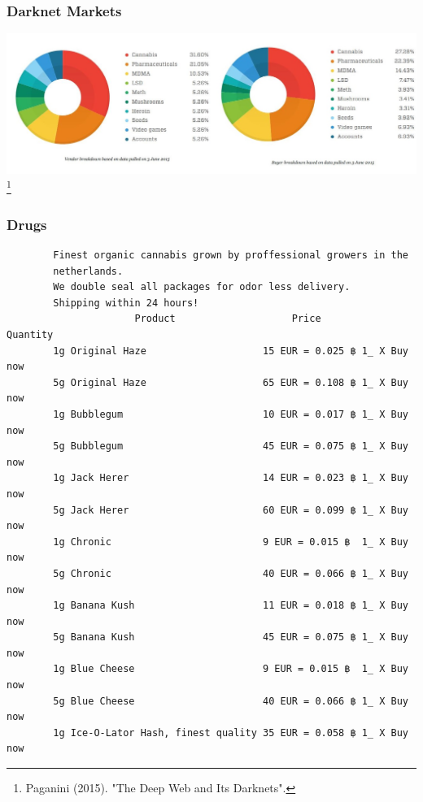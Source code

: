 \documentclass[t,xcolor={svgnames,table}]{beamer}
\begin{document}
\begin{frame}
	\frametitle{Darknet Markets}
	
	\includegraphics[trim={0 2cm 16cm 1cm},clip,width=\pagewidth]{DeepWeb-Black-markets-vendors-buyers.jpg}\footnote{Paganini (2015). "The Deep Web and Its Darknets".}
\end{frame}

\begin{frame}[fragile]
	\frametitle{Drugs}
	
	\color{OwlGreen}
	\small
	\begin{verbatim}
		Finest organic cannabis grown by proffessional growers in the
		netherlands.
		We double seal all packages for odor less delivery.
		Shipping within 24 hours!
		              Product                    Price          Quantity
		1g Original Haze                    15 EUR = 0.025 ฿ 1_ X Buy now
		5g Original Haze                    65 EUR = 0.108 ฿ 1_ X Buy now
		1g Bubblegum                        10 EUR = 0.017 ฿ 1_ X Buy now
		5g Bubblegum                        45 EUR = 0.075 ฿ 1_ X Buy now
		1g Jack Herer                       14 EUR = 0.023 ฿ 1_ X Buy now
		5g Jack Herer                       60 EUR = 0.099 ฿ 1_ X Buy now
		1g Chronic                          9 EUR = 0.015 ฿  1_ X Buy now
		5g Chronic                          40 EUR = 0.066 ฿ 1_ X Buy now
		1g Banana Kush                      11 EUR = 0.018 ฿ 1_ X Buy now
		5g Banana Kush                      45 EUR = 0.075 ฿ 1_ X Buy now
		1g Blue Cheese                      9 EUR = 0.015 ฿  1_ X Buy now
		5g Blue Cheese                      40 EUR = 0.066 ฿ 1_ X Buy now
		1g Ice-O-Lator Hash, finest quality 35 EUR = 0.058 ฿ 1_ X Buy now
	\end{verbatim}
\end{frame}
\end{document}
